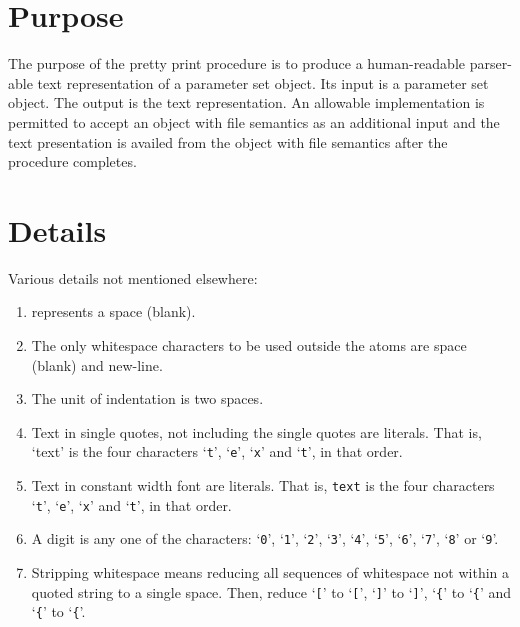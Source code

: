 \documentclass[12pt]{article}
\begin{document}
\section*{Purpose}
The purpose of the pretty print procedure is to produce
a human-readable parser-able text representation of a
parameter set object.
Its input is a parameter set object.
The output is the text representation.
An allowable implementation is permitted to accept
an object with file semantics as an additional input
and the text presentation is availed from the object
with file semantics after the procedure completes.
\section*{Details}
Various details not mentioned elsewhere:
\begin{enumerate}
\item {\textvisiblespace} represents a space (blank).
\item The only whitespace characters to be used outside the atoms are
      space (blank) and new-line.
\item The unit of indentation is two spaces.
\item Text in single quotes, not including the single quotes are literals.
      That is, `text' is the four characters `\verb+t+', `\verb+e+',
      `\verb+x+' and `\verb+t+', in that order.
\item Text in constant width font are literals.
      That is, {\tt text} is the four characters `\verb+t+', `\verb+e+',
      `\verb+x+' and `\verb+t+', in that order.
\item A digit is any one of the characters: `\verb+0+', `\verb+1+', `\verb+2+',
      `\verb+3+', `\verb+4+', `\verb+5+', `\verb+6+', `\verb+7+', `\verb+8+' or
      `\verb+9+'.
\item Stripping whitespace means reducing all sequences of whitespace not
      within a quoted string to a single space.
      Then, reduce `\verb+[+\textvisiblespace' to `\verb+[+',
      `\textvisiblespace\verb+]+' to `\verb+]+',
      `\verb+{+\textvisiblespace' to `\verb+{+' and
      `\textvisiblespace\verb+{+' to `\verb+{+'.
\end{enumerate}
\end{document}
